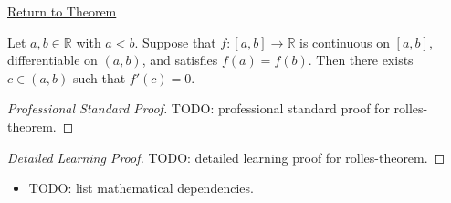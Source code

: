 \newpage
{}
\label{prf:rolles-theorem}

\begin{remark*}[Return]
\hyperref[thm:rolles-theorem]{Return to Theorem}
\end{remark*}

\begin{theorem*}
Let $a, b \in \mathbb{R}$ with $a < b$. Suppose that $f : [a,b] \to \mathbb{R}$ is continuous on $[a,b]$, differentiable on $(a,b)$, and satisfies $f(a) = f(b)$. Then there exists $c \in (a,b)$ such that $f'(c) = 0$.
\end{theorem*}

\begin{proof}[Professional Standard Proof]
\LRAProofBodyStart
TODO: professional standard proof for rolles-theorem.
\end{proof}

\begin{proof}[Detailed Learning Proof]
\LRAProofBodyStart
TODO: detailed learning proof for rolles-theorem.
\end{proof}

\begin{remark*}
\end{remark*}

\begin{dependencies}
\begin{itemize}
  \item TODO: list mathematical dependencies.
\end{itemize}
\end{dependencies}

\clearpage
